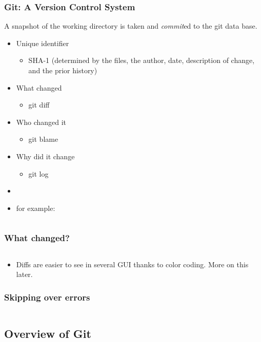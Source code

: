 \begin{frame}
  \frametitle{Git: A Version Control System}
  A snapshot of the working directory is taken and \emph{commit}ed to the git data base.
  \begin{itemize}
    \item Unique identifier
      \begin{itemize}
        \item SHA-1 (determined by the files, the author, date, description of change, and the prior history)
      \end{itemize}
    \item What changed \begin{itemize} \item  git diff \end{itemize}
    \item Who changed it \begin{itemize} \item git blame \end{itemize}
    \item Why did it change \begin{itemize} \item git log \end{itemize}
    \item[]
    \item for example:
  \end{itemize}
\end{frame}

\begin{frame}[t,fragile]
  \tiny
  \inputminted{text}{eglog.log}
\end{frame}

\begin{frame}[t,fragile]
  \frametitle{What changed?}
  \small
  \inputminted{text}{egdiff}

  \normalsize
  \begin{itemize}
    \item Diffs are easier to see in several GUI thanks to color coding. More on
      this later.
  \end{itemize}
\end{frame}

\begin{frame}[t,fragile]
  \frametitle{Skipping over errors}
  \small
  \inputminted[firstline=1,lastline=10]{text}{eglog.log}
\end{frame}

\subsection{Overview of Git}

